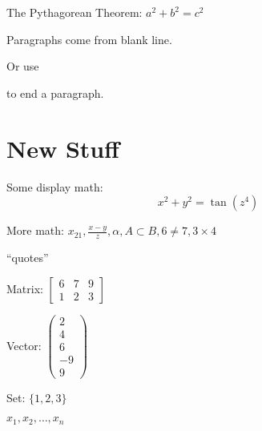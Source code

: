 \documentclass[12pt]{article}
\begin{document}
The Pythagorean Theorem: \(a^2+b^2=c^2\)

Paragraphs come from blank line.

Or use \par to end a paragraph.

\section{New Stuff}

Some display math: \[x^2 + y^2 = \tan(z^4)\]

More math: \(x_{21}, \frac{x-y}{z}, \alpha, A\subset B, 6\neq 7, 3\times 4\)

``quotes''

Matrix:
\(\begin{bmatrix}
6 & 7 & 9\\
1 & 2 & 3
\end{bmatrix}\)


Vector:
\(\begin{pmatrix}
2\\
4\\
6\\
-9\\
9
\end{pmatrix}\)

Set: \(\{1, 2, 3\}\)

\(x_1, x_2,\ldots, x_n\)
\end{document}
